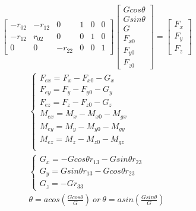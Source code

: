 \documentclass[12pt]{article}
\begin{document}
\begin{CJK}{UTF8}{bsmi}
\begin{equation*}
\begin{split}
\begin{bmatrix}
-r_{02}		&-r_{12}	&0			&1	&0	&0\\
-r_{12}		&r_{02}		&0			&0	&1	&0\\
0			&0			&-r_{22}	&0	&0	&1
\end{bmatrix}
\begin{bmatrix}
Gcos\theta\\
Gsin\theta\\
G\\
F_{x0}\\
F_{y0}\\
F_{z0}
\end{bmatrix}
=
\begin{bmatrix}
F_x\\
F_y\\
F_z
\end{bmatrix}
\end{split}
\end{equation*}
\begin{equation*}
\begin{split}
\left\{\begin{matrix}
F_{ex} = F_x - F_{x0} - G_x\\
F_{ey} = F_y - F_{y0} - G_y\\
F_{ez} = F_z - F_{z0} - G_z\\
M_{ex} = M_x - M_{x0} - M_{gx}\\
M_{ey} = M_y - M_{y0} - M_{gy}\\
M_{ez} = M_z - M_{z0} - M_{gz}\\
\end{matrix}\right.\\
\left\{\begin{matrix}
G_x = -Gcos\theta r_{13} - Gsin\theta r_{23}\\
G_y =  Gsin\theta r_{13} - Gcos\theta r_{23}\\
G_z = -Gr_{33}
\end{matrix}\right.\\
\theta = acos\left(\frac{Gcos\theta }{G}\right)\ or\ \theta = asin\left(\frac{Gsin\theta }{G}\right)                
\end{split}
\end{equation*}


\end{CJK}
\end{document}
